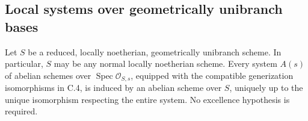 \subsection{Local systems over geometrically unibranch bases}

\begin{theorem}
\label{thm:C-RD7}
Let $S$ be a reduced, locally noetherian, geometrically unibranch scheme.
In particular, $S$ may be any normal locally noetherian scheme.
Every system $A(s)$ of
abelian schemes over $\operatorname{Spec}\mathcal O_{S,s}$, equipped
with the compatible generization isomorphisms in C.4, is induced by an
abelian scheme over $S$, uniquely up to the unique isomorphism
respecting the entire system. No excellence hypothesis is required.
\end{theorem}
